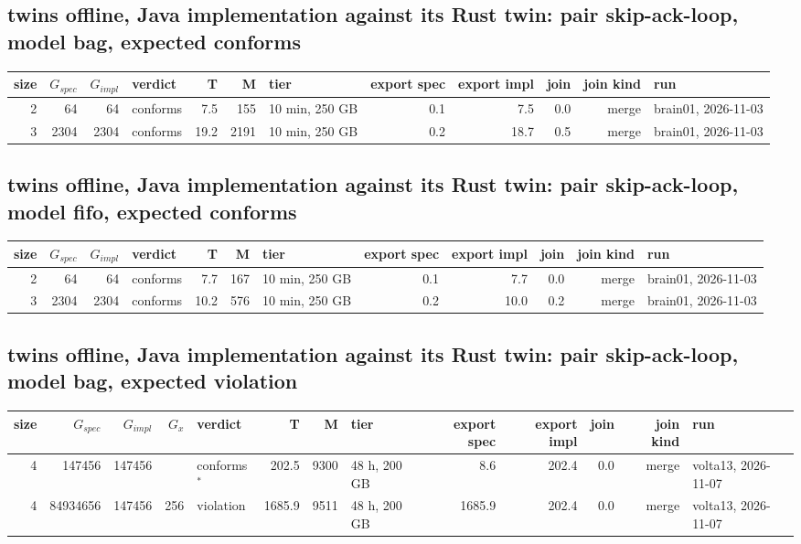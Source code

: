 \documentclass[10pt]{article}
\begin{document}
\subsection*{twins offline, Java implementation against its Rust twin: pair \textsf{skip-ack-loop}, model bag, expected conforms}
\begin{longtable}{@{}rrrlrrlrrrrl@{}}
\toprule
size & $G_{\mathit{spec}}$ & $G_{\mathit{impl}}$ & verdict & T & M & tier & export spec & export impl & join & join kind & run \\
\midrule
\endhead
\color{blue} 2 & 64 & 64 & conforms & 7.5 & 155 & 10 min, 250 GB & 0.1 & 7.5 & 0.0 & merge & brain01, 2026-11-03 \\
\color{blue} 3 & 2304 & 2304 & conforms & 19.2 & 2191 & 10 min, 250 GB & 0.2 & 18.7 & 0.5 & merge & brain01, 2026-11-03 \\
\bottomrule
\end{longtable}
\subsection*{twins offline, Java implementation against its Rust twin: pair \textsf{skip-ack-loop}, model fifo, expected conforms}
\begin{longtable}{@{}rrrlrrlrrrrl@{}}
\toprule
size & $G_{\mathit{spec}}$ & $G_{\mathit{impl}}$ & verdict & T & M & tier & export spec & export impl & join & join kind & run \\
\midrule
\endhead
\color{blue} 2 & 64 & 64 & conforms & 7.7 & 167 & 10 min, 250 GB & 0.1 & 7.7 & 0.0 & merge & brain01, 2026-11-03 \\
\color{blue} 3 & 2304 & 2304 & conforms & 10.2 & 576 & 10 min, 250 GB & 0.2 & 10.0 & 0.2 & merge & brain01, 2026-11-03 \\
\bottomrule
\end{longtable}
\subsection*{twins offline, Java implementation against its Rust twin: pair \textsf{skip-ack-loop}, model bag, expected violation}
\begin{longtable}{@{}rrrrlrrlrrrrl@{}}
\toprule
size & $G_{\mathit{spec}}$ & $G_{\mathit{impl}}$ & $G_x$ & verdict & T & M & tier & export spec & export impl & join & join kind & run \\
\midrule
\endhead
\color{red} 4 & 147456 & 147456 &  & conforms$^{\ast}$ & 202.5 & 9300 & 48 h, 200 GB & 8.6 & 202.4 & 0.0 & merge & volta13, 2026-11-07 \\
\color{red} 4 & 84934656 & 147456 & 256 & violation & 1685.9 & 9511 & 48 h, 200 GB & 1685.9 & 202.4 & 0.0 & merge & volta13, 2026-11-07 \\
\bottomrule
\end{longtable}
\end{document}
